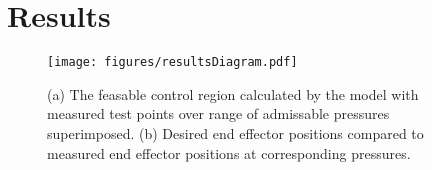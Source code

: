 \section{Results}   \label{sec:results}



\begin{figure}
    \centering
    \texttt{[image: figures/resultsDiagram.pdf]}
    \caption{(a) The feasable control region calculated by the model with measured test points over range of admissable pressures superimposed. (b) Desired end effector positions compared to measured end effector positions at corresponding pressures. }
    \label{fig:results}
\end{figure}

